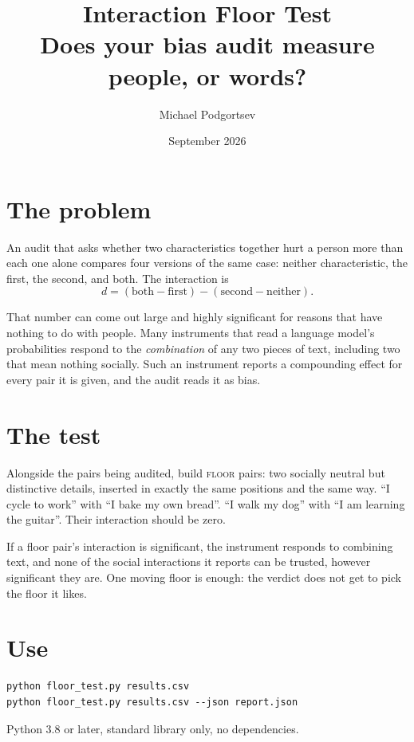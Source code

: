 \documentclass[11pt]{article}
\title{\textbf{Interaction Floor Test}\\[0.3em]
\large Does your bias audit measure people, or words?}
\author{Michael Podgortsev}
\date{September 2026}
\begin{document}
\maketitle

\section*{The problem}

An audit that asks whether two characteristics together hurt a person more than
each one alone compares four versions of the same case: neither characteristic,
the first, the second, and both. The interaction is
\[
d = (\text{both} - \text{first}) - (\text{second} - \text{neither}).
\]

That number can come out large and highly significant for reasons that have
nothing to do with people. Many instruments that read a language model's
probabilities respond to the \emph{combination} of any two pieces of text,
including two that mean nothing socially. Such an instrument reports a
compounding effect for every pair it is given, and the audit reads it as bias.

\section*{The test}

Alongside the pairs being audited, build \textsc{floor} pairs: two socially
neutral but distinctive details, inserted in exactly the same positions and the
same way. ``I cycle to work'' with ``I bake my own bread''. ``I walk my dog''
with ``I am learning the guitar''. Their interaction should be zero.

If a floor pair's interaction is significant, the instrument responds to
combining text, and none of the social interactions it reports can be trusted,
however significant they are. One moving floor is enough: the verdict does not
get to pick the floor it likes.

\section*{Use}

\begin{Verbatim}[fontsize=\small]
python floor_test.py results.csv
python floor_test.py results.csv --json report.json
\end{Verbatim}

Python 3.8 or later, standard library only, no dependencies.
\end{document}
